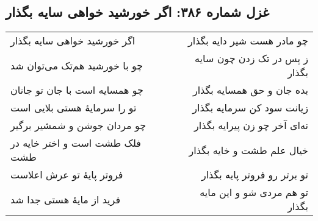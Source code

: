 \begin{center}
\section*{غزل شماره ۳۸۶: اگر خورشید خواهی سایه بگذار}
\label{sec:386}
\begin{longtable}{l p{0.5cm} r}
اگر خورشید خواهی سایه بگذار
&&
چو مادر هست شیر دایه بگذار
\\
چو با خورشید هم‌تک می‌توان شد
&&
ز پس در تک زدن چون سایه بگذار
\\
چو همسایه است با جان تو جانان
&&
بده جان و حق همسایه بگذار
\\
تو را سرمایهٔ هستی بلایی است
&&
زیانت سود کن سرمایه بگذار
\\
چو مردان جوشن و شمشیر برگیر
&&
نه‌ای آخر چو زن پیرایه بگذار
\\
فلک طشت است و اختر خایه در طشت
&&
خیال علم طشت و خایه بگذار
\\
فروتر پایهٔ تو عرش اعلاست
&&
تو برتر رو فروتر پایه بگذار
\\
فرید از مایهٔ هستی جدا شد
&&
تو هم مردی شو و این مایه بگذار
\\
\end{longtable}
\end{center}
